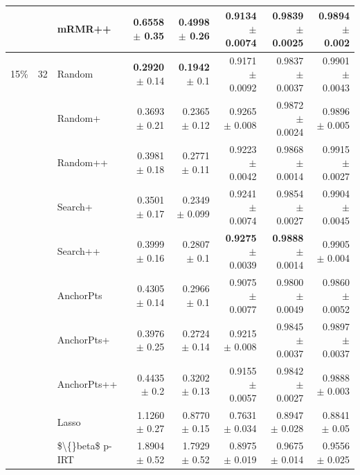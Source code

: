 \begin{longtable}{llp{}rrrrr}
 &  & mRMR++ & 0.6558 {\scriptsize $\pm$ 0.35} & 0.4998 {\scriptsize $\pm$ 0.26} & 0.9134 {\scriptsize $\pm$ 0.0074} & 0.9839 {\scriptsize $\pm$ 0.0025} & 0.9894 {\scriptsize $\pm$ 0.002} \\
\midrule
15\% & 32 & Random & \textbf{0.2920} {\scriptsize $\pm$ 0.14} & \textbf{0.1942} {\scriptsize $\pm$ 0.1} & 0.9171 {\scriptsize $\pm$ 0.0092} & 0.9837 {\scriptsize $\pm$ 0.0037} & 0.9901 {\scriptsize $\pm$ 0.0043} \\
 &  & Random+ & 0.3693 {\scriptsize $\pm$ 0.21} & 0.2365 {\scriptsize $\pm$ 0.12} & 0.9265 {\scriptsize $\pm$ 0.008} & 0.9872 {\scriptsize $\pm$ 0.0024} & 0.9896 {\scriptsize $\pm$ 0.005} \\
 &  & Random++ & 0.3981 {\scriptsize $\pm$ 0.18} & 0.2771 {\scriptsize $\pm$ 0.11} & 0.9223 {\scriptsize $\pm$ 0.0042} & 0.9868 {\scriptsize $\pm$ 0.0014} & 0.9915 {\scriptsize $\pm$ 0.0027} \\
 &  & Search+ & 0.3501 {\scriptsize $\pm$ 0.17} & 0.2349 {\scriptsize $\pm$ 0.099} & 0.9241 {\scriptsize $\pm$ 0.0074} & 0.9854 {\scriptsize $\pm$ 0.0027} & 0.9904 {\scriptsize $\pm$ 0.0045} \\
 &  & Search++ & 0.3999 {\scriptsize $\pm$ 0.16} & 0.2807 {\scriptsize $\pm$ 0.1} & \textbf{0.9275} {\scriptsize $\pm$ 0.0039} & \textbf{0.9888} {\scriptsize $\pm$ 0.0014} & 0.9905 {\scriptsize $\pm$ 0.004} \\
 &  & AnchorPts & 0.4305 {\scriptsize $\pm$ 0.14} & 0.2966 {\scriptsize $\pm$ 0.1} & 0.9075 {\scriptsize $\pm$ 0.0077} & 0.9800 {\scriptsize $\pm$ 0.0049} & 0.9860 {\scriptsize $\pm$ 0.0052} \\
 &  & AnchorPts+ & 0.3976 {\scriptsize $\pm$ 0.25} & 0.2724 {\scriptsize $\pm$ 0.14} & 0.9215 {\scriptsize $\pm$ 0.008} & 0.9845 {\scriptsize $\pm$ 0.0037} & 0.9897 {\scriptsize $\pm$ 0.0037} \\
 &  & AnchorPts++ & 0.4435 {\scriptsize $\pm$ 0.2} & 0.3202 {\scriptsize $\pm$ 0.13} & 0.9155 {\scriptsize $\pm$ 0.0057} & 0.9842 {\scriptsize $\pm$ 0.0027} & 0.9888 {\scriptsize $\pm$ 0.003} \\
 &  & Lasso & 1.1260 {\scriptsize $\pm$ 0.27} & 0.8770 {\scriptsize $\pm$ 0.15} & 0.7631 {\scriptsize $\pm$ 0.034} & 0.8947 {\scriptsize $\pm$ 0.028} & 0.8841 {\scriptsize $\pm$ 0.05} \\
 &  & \$\textbackslash\{\}beta\$ p-IRT & 1.8904 {\scriptsize $\pm$ 0.52} & 1.7929 {\scriptsize $\pm$ 0.52} & 0.8975 {\scriptsize $\pm$ 0.019} & 0.9675 {\scriptsize $\pm$ 0.014} & 0.9556 {\scriptsize $\pm$ 0.025} \\

\end{longtable}
